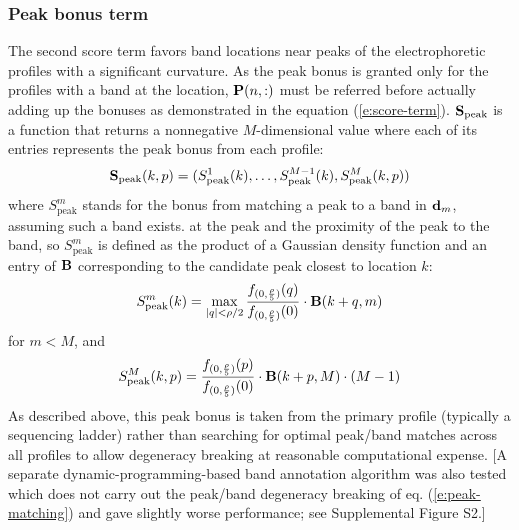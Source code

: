 \subsubsection{Peak bonus term}\label{sss:peak_bonus_term}
The second score term favors band locations near peaks of the electrophoretic profiles with a significant curvature. As the peak bonus is granted only for the profiles with a band at the location, ${\mathbf{P}}(n,:)$ must be referred before actually adding up the bonuses as demonstrated in the equation (\ref{e:score-term}).
$\bold{S}_{\textrm{peak}}$ is a function that returns a nonnegative $M$-dimensional value where each of its entries represents the peak bonus from each profile:
%
\begin{equation}
\bold{S}_{\textrm{peak}}(k,p) = (S^1_{\textrm{peak}}(k), \ldots, S^{M-1}_{\textrm{peak}}(k), S^M_{\textrm{peak}}(k,p))
\end{equation}
%
where $S^m_{\textrm{peak}}$ stands for the bonus from matching a peak to a band in ${\mathbf{d}}_m$, assuming such a band exists.  at the peak and the proximity of the peak to the band, so $S^m_{\textrm{peak}}$ is defined as the product of a Gaussian density function and an entry of ${\mathbf{B}}$ corresponding to the candidate peak closest to location $k$:
%
\begin{equation}
S^m_{\textrm{peak}}(k) = \max_{\substack{|q| < \rho/2}} {{f_{(0, {\rho \over 5})}(q)} \over {f_{(0, {\rho \over 5})}(0)}} \cdot {\mathbf{B}}(k+q, m)
\end{equation}
%
for $m < M$, and
%
\begin{equation}\label{e:peak-matching}
S^M_{\textrm{peak}}(k,p) = {{f_{(0, {\rho \over 5})}(p)} \over {f_{(0, {\rho \over 5})}(0)}} \cdot {\mathbf{B}}(k+p, {M}) \cdot (M-1)
\end{equation}
%
As described above, this peak bonus is taken from the primary profile (typically a sequencing ladder) rather than searching for optimal peak/band matches across all profiles to allow degeneracy breaking at reasonable computational expense.  [A separate dynamic-programming-based band annotation algorithm was also tested which does not carry out the peak/band degeneracy breaking of eq. (\ref{e:peak-matching}) and gave slightly worse performance; see Supplemental Figure S2.]

